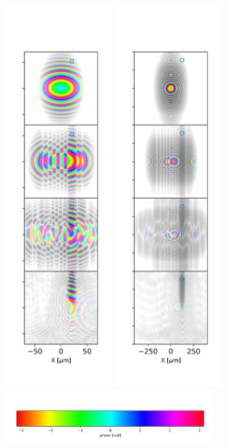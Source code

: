 \documentclass{iucr}              %
\begin{document}
\begin{figure}
\includegraphics[width=0.32\textwidth]{Figures/vx_id16a_C5_propagated.png}
\includegraphics[width=0.32\textwidth]{Figures/vx_id16a_C_propagated.png}
\includegraphics[width=7cm]{Figures/color_bar.png}

\end{figure}
\end{document}
